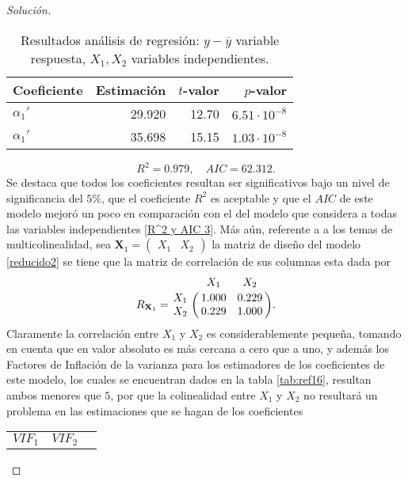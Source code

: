 \documentclass[10.5pt,notitlepage]{article}
\newenvironment{solucion}
  {\begin{proof}[Solución]}
  {\end{proof}}
\theoremstyle{plain}
\begin{document}
\begin{solucion}
\begin{table}[H]
        \centering
        \begin{tabular}{@{}l@{\hskip 0.3in}r@{\hskip 0.3in}r@{\hskip 0.3in}r@{}}
            \toprule
            Coeficiente& Estimación & \(t\)-valor& \(p\)-valor \\
        \midrule
\(\alpha_{1}'\) &  29.920 &12.70& \(6.51\cdot10^{-8}\)\\
 \(\alpha_{1}'\)& 35.698 &15.15& \(1.03\cdot10^{-8}\)\\                    \bottomrule
        \end{tabular}
        \caption{Resultados análisis de regresión: \(y - \overline{y}\) variable respuesta, \(X_1, X_2\) variables independientes.}
        \label{tab:ref13}
\end{table}
\begin{equation}\label{R^2 y AIC 4}
    R^2 = 0.979, \quad AIC = 62.312.
\end{equation}
Se destaca que todos los coeficientes resultan ser significativos bajo un nivel de significancia del \(5\%\), que el coeficiente \(R^2\) es aceptable y que el \(AIC\) de este modelo mejoró un poco en comparación con el del modelo que considera a todas las variables independientes \eqref{R^2 y AIC 3}. Más aún, referente a a los temas de multicolinealidad, sea \(\mathbf{X}_{1} = \begin{pmatrix}X_1 & X_2\end{pmatrix}\) la matriz de diseño del modelo \eqref{reducido2} se tiene que la matriz de correlación de sus columnas esta dada por
\begin{equation}\label{cor 4}
R_{\mathbf{X}_{1}} = \bordermatrix{
   & X_1  & X_2\cr
X_1& 1.000 &0.229\cr
X_2& 0.229 &1.000
  }.
\end{equation}
Claramente la correlación entre \(X_1\) y \(X_2\) es considerablemente pequeña, tomando en cuenta que en valor absoluto es más cercana a cero que a uno, y además los Factores de Inflación de la varianza para los estimadores de los coeficientes de este modelo, los cuales se encuentran dados en la tabla \ref{tab:ref16}, resultan ambos menores que \(5\), por que la colinealidad entre \(X_1\) y \(X_2\) no resultará un problema en las estimaciones que se hagan de los coeficientes
\begin{table}[H]
        \centering
        \begin{tabular}{@{}l@{\hskip 0.3in}r@{\hskip 0.3in}r@{}}
            \toprule
            \(VIF_1\)& \(VIF_2\) \\

\end{tabular}
\end{table}
\end{solucion}
\end{document}
